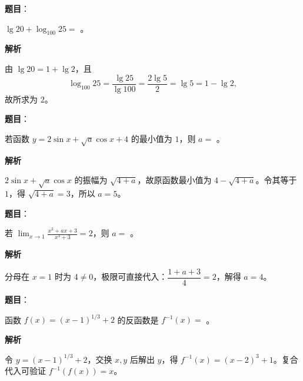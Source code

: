 

\begin{answer}

\textbf{题目}：

$\lg 20+\log_{100}25=$ \gkblank{}。

\textbf{解析}

由 $\lg20=1+\lg2$，且
\nopagebreak[4]
\[
\log_{100}25=\frac{\lg25}{\lg100}=\frac{2\lg5}{2}=\lg5=1-\lg2,
\]
故所求为 $2$。


\end{answer}
\begin{answer}

\textbf{题目}：

若函数 $y=2\sin x+\sqrt a\cos x+4$ 的最小值为 $1$，则 $a=$ \gkblank{}。

\textbf{解析}

$2\sin x+\sqrt a\cos x$ 的振幅为 $\sqrt{4+a}$，故原函数最小值为 $4-\sqrt{4+a}$。令其等于 $1$，得 $\sqrt{4+a}=3$，所以 $a=5$。


\end{answer}
\begin{answer}

\textbf{题目}：

若 $\displaystyle\lim_{x\to1}\frac{x^2+ax+3}{x^3+3}=2$，则 $a=$ \gkblank{}。

\textbf{解析}

分母在 $x=1$ 时为 $4\ne0$，极限可直接代入：$\dfrac{1+a+3}{4}=2$，解得 $a=4$。


\end{answer}
\begin{answer}

\textbf{题目}：

函数 $f(x)=(x-1)^{1/3}+2$ 的反函数是 $f^{-1}(x)=$ \gkblank{}。

\textbf{解析}

令 $y=(x-1)^{1/3}+2$，交换 $x,y$ 后解出 $y$，得 $f^{-1}(x)=(x-2)^3+1$。复合代入可验证 $f^{-1}(f(x))=x$。


\end{answer}
